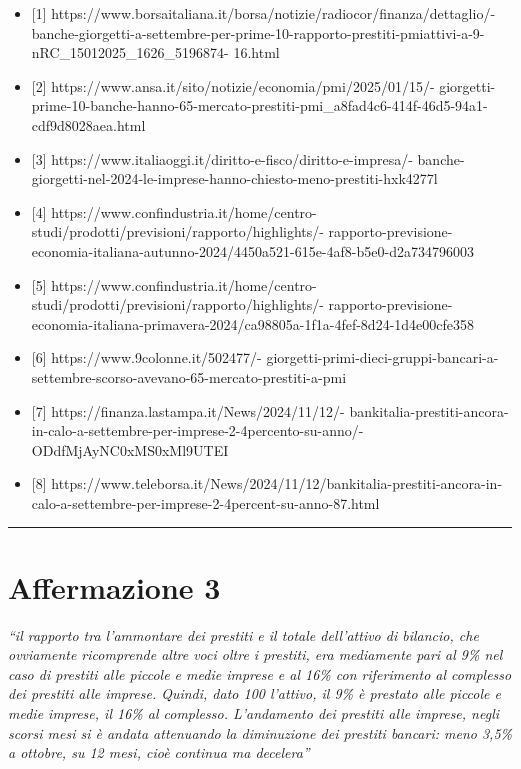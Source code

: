 \documentclass[
  letterpaper,
  DIV=11,
  numbers=noendperiod]{scrartcl}
\providecommand{\tightlist}{%
  \setlength{\itemsep}{0pt}\setlength{\parskip}{0pt}}\usepackage{longtable,booktabs,array}
\begin{document}
\begin{itemize}
\tightlist
\item
  {[}1{]}
  https://www.borsaitaliana.it/borsa/notizie/radiocor/finanza/dettaglio/-
  banche-giorgetti-a-settembre-per-prime-10-rapporto-prestiti-pmiattivi-a-9-nRC\_15012025\_1626\_5196874-
  16.html
\item
  {[}2{]} https://www.ansa.it/sito/notizie/economia/pmi/2025/01/15/-
  giorgetti-prime-10-banche-hanno-65-mercato-prestiti-pmi\_a8fad4c6-414f-46d5-94a1-cdf9d8028aea.html
\item
  {[}3{]} https://www.italiaoggi.it/diritto-e-fisco/diritto-e-impresa/-
  banche-giorgetti-nel-2024-le-imprese-hanno-chiesto-meno-prestiti-hxk4277l
\item
  {[}4{]}
  https://www.confindustria.it/home/centro-studi/prodotti/previsioni/rapporto/highlights/-
  rapporto-previsione-economia-italiana-autunno-2024/4450a521-615e-4af8-b5e0-d2a734796003
\item
  {[}5{]}
  https://www.confindustria.it/home/centro-studi/prodotti/previsioni/rapporto/highlights/-
  rapporto-previsione-economia-italiana-primavera-2024/ca98805a-1f1a-4fef-8d24-1d4e00cfe358
\item
  {[}6{]} https://www.9colonne.it/502477/-
  giorgetti-primi-dieci-gruppi-bancari-a-settembre-scorso-avevano-65-mercato-prestiti-a-pmi
\item
  {[}7{]} https://finanza.lastampa.it/News/2024/11/12/-
  bankitalia-prestiti-ancora-in-calo-a-settembre-per-imprese-2-4percento-su-anno/-
  ODdfMjAyNC0xMS0xMl9UTEI
\item
  {[}8{]}
  https://www.teleborsa.it/News/2024/11/12/bankitalia-prestiti-ancora-in-calo-a-settembre-per-imprese-2-4percent-su-anno-87.html
\end{itemize}

\begin{center}\rule{0.5\linewidth}{0.5pt}\end{center}

\section{Affermazione 3}\label{affermazione-3}

\emph{``il rapporto tra l'ammontare dei prestiti e il totale dell'attivo
di bilancio, che ovviamente ricomprende altre voci oltre i prestiti, era
mediamente pari al 9\% nel caso di prestiti alle piccole e medie imprese
e al 16\% con riferimento al complesso dei prestiti alle imprese.
Quindi, dato 100 l'attivo, il 9\% è prestato alle piccole e medie
imprese, il 16\% al complesso. L'andamento dei prestiti alle imprese,
negli scorsi mesi si è andata attenuando la diminuzione dei prestiti
bancari: meno 3,5\% a ottobre, su 12 mesi, cioè continua ma decelera''}
\end{document}
